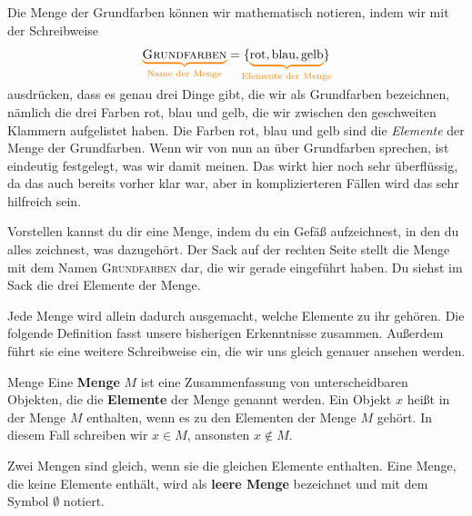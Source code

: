 \documentclass[../../main.tex]{subfiles}
\begin{document}
\begin{example}{}

    Die Menge der Grundfarben können wir mathematisch notieren, indem wir mit der Schreibweise
    \[\colorbrace{\textsc{Grundfarben}}{\text{Name der Menge}}=\{\colorbrace{\text{rot},\text{blau},\text{gelb}}{\text{Elemente der Menge}}\}\]
    ausdrücken, dass es genau drei Dinge gibt, die wir als Grundfarben bezeichnen, nämlich die drei Farben rot, blau und gelb, die wir zwischen den geschweiten Klammern aufgelistet haben. Die Farben rot, blau und gelb sind die \emph{Elemente} der Menge der Grundfarben. Wenn wir von nun an über Grundfarben sprechen, ist eindeutig festgelegt, was wir damit meinen. Das wirkt hier noch sehr überflüssig, da das auch bereits vorher klar war, aber in komplizierteren Fällen wird das sehr hilfreich sein.

    Vorstellen kannst du dir eine Menge, indem du ein Gefäß aufzeichnest, in den du alles zeichnest, was dazugehört. Der Sack auf der rechten Seite stellt die Menge mit dem Namen \textsc{Grundfarben} dar, die wir gerade eingeführt haben. Du siehst im Sack die drei Elemente der Menge.
\end{example}

Jede Menge wird allein dadurch ausgemacht, welche Elemente zu ihr gehören. Die folgende Definition fasst unsere bisherigen Erkenntnisse zusammen. Außerdem führt sie eine weitere Schreibweise ein, die wir uns gleich genauer ansehen werden.

\begin{definition}{Menge}
    Eine \textbf{Menge} $M$ ist eine Zusammenfassung von unterscheidbaren Objekten, die die \textbf{Elemente} der Menge genannt werden. Ein Objekt $x$ heißt in der Menge $M$ enthalten, wenn es zu den Elementen der Menge $M$ gehört. In diesem Fall schreiben wir $x\in M$, ansonsten $x\notin M$.

    Zwei Mengen sind gleich, wenn sie die gleichen Elemente enthalten. Eine Menge, die keine Elemente enthält, wird als \textbf{leere Menge} bezeichnet und mit dem Symbol $\emptyset$ notiert.
\end{definition}
\end{document}
